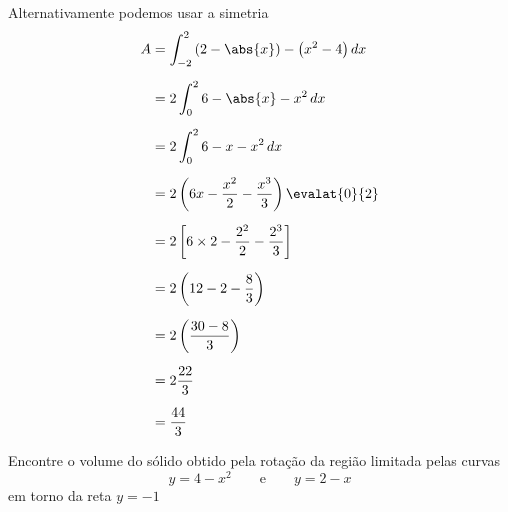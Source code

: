 \documentclass[a4paper,12pt,fleqn]{article}
\begin{document}
\begin{answer}
  Alternativamente podemos usar a simetria
  \begin{align*}
    A & = \int_{-2}^2 \left(2-\abs{x}\right) - \left(x^2-4\right) dx \\[2mm]
      & = 2 \int_0^2  6 -\abs{x} -x^2 \,dx \\[2mm]
      & = 2 \int_0^2  6 -x -x^2 \,dx\\[2mm]
      & = 2\left( 6x -\frac{x^2}{2} -\frac{x^3}{3} \right)\evalat{0}{2} \\[2mm]
      & = 2\left[ 6\times 2 -\frac{2^2}{2} -\frac{2^3}{3} \right] \\[2mm]
      & = 2\left(12 -2 - \frac{8}{3}\right)\\[2mm]
      & = 2\left(\frac{30-8}{3}\right) \\[2mm]
      & = 2\frac{22}{3} \\[2mm]
      & = \frac{44}{3}
  \end{align*}



\end{answer}

Encontre o volume do sólido obtido pela rotação
da região limitada pelas curvas
\[
  y=4-x^2
  \qquad\text{e}\qquad
  y=2-x
\]
em torno da reta
\(
  y = -1
\)
\end{document}

